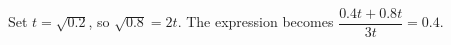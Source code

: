 Set $t=\sqrt{0.2}$, so $\sqrt{0.8}=2t$. The expression becomes $\dfrac{0.4t+0.8t}{3t}=\boxed{0.4}$.

